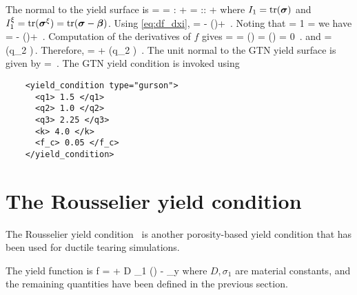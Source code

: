   The normal to the yield surface is
  \Beq
    \BN = 
        = :\Partial{\Bxi}{\Bsig} + 
        = :\Partial{\Bxi}{\BsT}:\Partial{\BsT}{\Bsig} + 
  \Eeq
  where $I_1 = \text{tr}(\boldsymbol{\sigma})$ and $I_1^\xi = \text{tr}(\boldsymbol{\sigma}^\xi) = \text{tr}(\boldsymbol{\sigma} - \boldsymbol{\beta})$.  
  Using \eqref{eq:df_dxi},
  \Beq
    \BN =  - \Third \Tr\left(\right)\BI +
           \,.
  \Eeq
  Noting that
  \Beq
     = 1 \quad \Tand \quad
     = \BI
  \Eeq
  we have
  \Beq
    \BN =  - \Third \Tr\left(\right)\BI +
           \BI \,.
  \Eeq
  Computation of the derivatives of $f$ gives
  \Beq
     =  \Partial{\sigma^\xi_\Teff}{\Bxi}
      =  \left(\right) \frac{\Bxi}{\Norm{\Bxi}{}}
      =  
    \quad \implies \quad
    \Tr\left(\right) = 0 \,.
  \Eeq
  and
  \Beq
     = 
     \sinh \left(q_2 \right)\,.
  \Eeq
  Therefore,
  \Beq
    \BN = 
      +  \sinh \left(q_2 \right) \BI\,.
  \Eeq
  The unit normal to the GTN yield surface is given by
  \Beq
    \hat{\BN} = \frac{\BN}{\Norm{\BN}{}} \,.
  \Eeq
  The GTN yield condition is invoked using
  \lstset{language=XML}
  \begin{lstlisting}
    <yield_condition type="gurson">
      <q1> 1.5 </q1>
      <q2> 1.0 </q2>
      <q3> 2.25 </q3>
      <k> 4.0 </k>
      <f_c> 0.05 </f_c>
    </yield_condition>
  \end{lstlisting}

\section{The Rousselier yield condition}
  The Rousselier yield condition~\cite{Bernauer2002} is another porosity-based yield
  condition that has been used for ductile tearing simulations.

  The yield function is
  \Beq
    f  =  +
         D \sigma_1 \phi \exp \left(\right) -
         \sigma_y 
  \Eeq
  where $D,\sigma_1$ are material constants, and the remaining quantities have been
  defined in the previous section.

